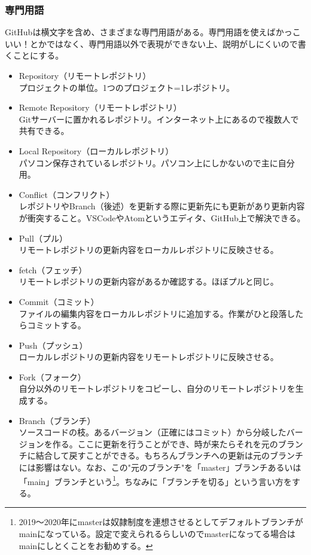 \documentclass[dvipdfmx,jb5]{jarticle}
\begin{document}
\subsubsection{専門用語}
GitHubは横文字を含め、さまざまな専門用語がある。専門用語を使えばかっこいい！とかではなく、専門用語以外で表現ができない上、説明がしにくいので書くことにする。
\begin{itemize}
\item Repository（リモートレポジトリ）\\
プロジェクトの単位。1つのプロジェクト=1レポジトリ。
\item Remote Repository（リモートレポジトリ）\\
Gitサーバーに置かれるレポジトリ。インターネット上にあるので複数人で共有できる。
\item Local Repository（ローカルレポジトリ）\\
パソコン保存されているレポジトリ。パソコン上にしかないので主に自分用。
\item Conflict（コンフリクト）\\
レポジトリやBranch（後述）を更新する際に更新先にも更新があり更新内容が衝突すること。VSCodeやAtomというエディタ、GitHub上で解決できる。
\item Pull（プル）\\
リモートレポジトリの更新内容をローカルレポジトリに反映させる。
\item fetch（フェッチ）\\
リモートレポジトリの更新内容があるか確認する。ほぼプルと同じ。
\item Commit（コミット）\\
ファイルの編集内容をローカルレポジトリに追加する。作業がひと段落したらコミットする。
\item Push（プッシュ）\\
ローカルレポジトリの更新内容をリモートレポジトリに反映させる。
\item Fork（フォーク）\\
自分以外のリモートレポジトリをコピーし、自分のリモートレポジトリを生成する。
\item Branch（ブランチ）\\
ソースコードの枝。あるバージョン（正確にはコミット）から分岐したバージョンを作る。ここに更新を行うことができ、時が来たらそれを元のブランチに結合して戻すことができる。もちろんブランチへの更新は元のブランチには影響はない。なお、この"元のブランチ"を「master」ブランチあるいは「main」ブランチという\footnote{2019〜2020年にmasterは奴隷制度を連想させるとしてデフォルトブランチがmainになっている。設定で変えられるらしいのでmasterになってる場合はmainにしとくことをお勧めする。}。ちなみに「ブランチを切る」という言い方をする。

\end{itemize}
\end{document}
